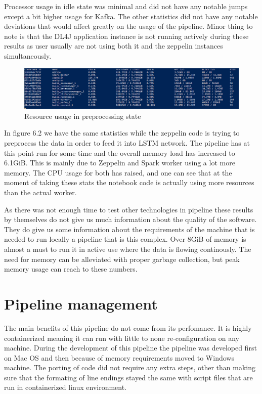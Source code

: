 Processor usage in idle state was minimal and did not have any notable jumps except a bit higher usage for Kafka.
The other statistics did not have any notable deviations that would affect greatly on the usage of the pipeline. 
Minor thing to note is that the DL4J application instance is not running actively during these results as user usually are not using both it and the zeppelin instances simultaneously.

\begin{figure}[ht!]
    \includegraphics[scale=0.45]{images/memory2} 
    \centering
    \caption{Resource usage in preprocessing state}
\end{figure}

In figure 6.2 we have the same statistics while the zeppelin code is trying to preprocess the data in order to feed it into LSTM network.
The pipeline has at this point run for some time and the overall memory load has increased to 6.1GiB.
This is mainly due to Zeppelin and Spark worker using a lot more memory.
The CPU usage for both has raised, and one can see that at the moment of taking these stats the notebook code is actually using more resources than the actual worker.

As there was not enough time to test other technologies in pipeline these results by themselves do not give us much information about the quality of the software.
They do give us some information about the requirements of the machine that is needed to run locally a pipeline that is this complex.
Over 8GiB of memory is almost a must to run it in active use where the data is flowing continously.
The need for memory can be alleviated with proper garbage collection, but peak memory usage can reach to these numbers.

\section{Pipeline management}

The main benefits of this pipeline do not come from its perfomance.
It is highly containerized meaning it can run with little to none re-configuration on any machine.
During the development of this pipeline the pipeline was developed first on Mac OS and then because of memory requirements moved to Windows machine.
The porting of code did not require any extra steps, other than making sure that the formating of line endings stayed the same with script files that are run in containerized linux environment.

